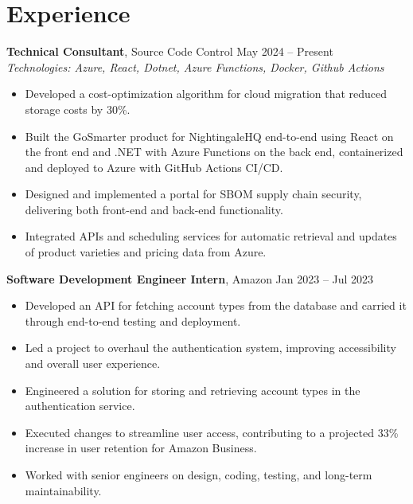 \documentclass[11pt,a4paper]{article}
\begin{document}
\section{Experience}
\textbf{Technical Consultant}, Source Code Control \hfill May 2024 -- Present
\\ \textit{Technologies: Azure, React, Dotnet, Azure Functions, Docker, Github Actions}
\begin{itemize}
  \item Developed a cost-optimization algorithm for cloud migration that reduced storage costs by 30\%.
  \item Built the GoSmarter product for NightingaleHQ end-to-end using React on the front end and .NET with Azure Functions on the back end, containerized and deployed to Azure with GitHub Actions CI/CD.
  \item Designed and implemented a portal for SBOM supply chain security, delivering both front-end and back-end functionality.
  \item Integrated APIs and scheduling services for automatic retrieval and updates of product varieties and pricing data from Azure.
\end{itemize}
\vspace{2pt}
\textbf{Software Development Engineer Intern}, Amazon \hfill Jan 2023 -- Jul 2023
\begin{itemize}
  \item Developed an API for fetching account types from the database and carried it through end-to-end testing and deployment.
  \item Led a project to overhaul the authentication system, improving accessibility and overall user experience.
  \item Engineered a solution for storing and retrieving account types in the authentication service.
  \item Executed changes to streamline user access, contributing to a projected 33\% increase in user retention for Amazon Business.
  \item Worked with senior engineers on design, coding, testing, and long-term maintainability.
\end{itemize}
\vspace{2pt}
\end{document}

